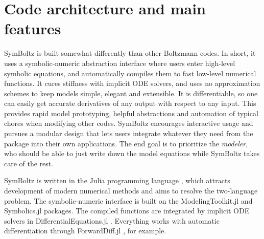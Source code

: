 \documentclass{aa}
\begin{document}

\section{Code architecture and main features}
\label{sec:features}

SymBoltz is built somewhat differently than other Boltzmann codes.
In short, it uses a symbolic-numeric abstraction interface where users enter high-level symbolic equations, and automatically compiles them to fast low-level numerical functions.
It cures stiffness with implicit ODE solvers, and uses no approximation schemes to keep models simple, elegant and extensible.
It is differentiable, so one can easily get accurate derivatives of any output with respect to any input.
This provides rapid model prototyping, helpful abstractions and automation of typical chores when modifying other codes.
SymBoltz encourages interactive usage and pursues a modular design that lets users integrate whatever they need from the package into their own applications.
The end goal is to prioritize the \emph{modeler}, who should be able to just write down the model equations while SymBoltz takes care of the rest.

SymBoltz is written in the Julia programming language \citep{bezansonJuliaFreshApproach2017a}, which attracts development of modern numerical methods and aims to resolve the two-language problem.
The symbolic-numeric interface is built on the ModelingToolkit.jl \citep{maModelingToolkitComposableGraph2022} and Symbolics.jl \citep{gowdaHighperformanceSymbolicnumericsMultiple2022} packages.
The compiled functions are integrated by implicit ODE solvers in DifferentialEquations.jl \citep{rackauckasDifferentialEquationsjlPerformantFeatureRich2017}.
Everything works with automatic differentiation through ForwardDiff.jl \citep{revelsForwardModeAutomaticDifferentiation2016}, for example.
\end{document}
